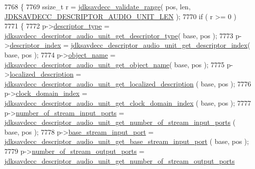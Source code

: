 \begin{DoxyCode}
7768 \{
7769     ssize\_t r = \hyperlink{group__util_ga9c02bdfe76c69163647c3196db7a73a1}{jdksavdecc\_validate\_range}( pos, len, 
      \hyperlink{group__descriptor__audio_ga9dc3459aa940c794fe03d7a04c3319c4}{JDKSAVDECC\_DESCRIPTOR\_AUDIO\_UNIT\_LEN} );
7770     \textcolor{keywordflow}{if} ( r >= 0 )
7771     \{
7772         p->\hyperlink{structjdksavdecc__descriptor__audio__unit_ab7c32b6c7131c13d4ea3b7ee2f09b78d}{descriptor\_type} = 
      \hyperlink{group__descriptor__audio_gad4b7e68dd3406168dbae73a3544a75ee}{jdksavdecc\_descriptor\_audio\_unit\_get\_descriptor\_type}( 
      base, pos );
7773         p->\hyperlink{structjdksavdecc__descriptor__audio__unit_a042bbc76d835b82d27c1932431ee38d4}{descriptor\_index} = 
      \hyperlink{group__descriptor__audio_gaa38833b7503f98f35a7047d138c55d63}{jdksavdecc\_descriptor\_audio\_unit\_get\_descriptor\_index}(
       base, pos );
7774         p->\hyperlink{structjdksavdecc__descriptor__audio__unit_a7d1f5945a13863b1762fc6db74fa8f80}{object\_name} = 
      \hyperlink{group__descriptor__audio_ga76bbf6a2c3634646b50a8987dafb5f96}{jdksavdecc\_descriptor\_audio\_unit\_get\_object\_name}( base, pos
       );
7775         p->\hyperlink{structjdksavdecc__descriptor__audio__unit_a0926f846ca65a83ad5bb06b4aff8f408}{localized\_description} = 
      \hyperlink{group__descriptor__audio_gaac4d24b626fb7665f8ebf4d98181b09c}{jdksavdecc\_descriptor\_audio\_unit\_get\_localized\_description}
      ( base, pos );
7776         p->\hyperlink{structjdksavdecc__descriptor__audio__unit_a6608f023d147b556a49527d568abed8e}{clock\_domain\_index} = 
      \hyperlink{group__descriptor__audio_ga2ae8a985361ba0fbe5c0ab4db5668ce8}{jdksavdecc\_descriptor\_audio\_unit\_get\_clock\_domain\_index}
      ( base, pos );
7777         p->\hyperlink{structjdksavdecc__descriptor__audio__unit_ad00c23883f3271704e11719abc6f7ad7}{number\_of\_stream\_input\_ports} = 
      \hyperlink{group__descriptor__audio_gadd8c4db853ace5bf571c73f102656e62}{jdksavdecc\_descriptor\_audio\_unit\_get\_number\_of\_stream\_input\_ports}
      ( base, pos );
7778         p->\hyperlink{structjdksavdecc__descriptor__audio__unit_a8ad4ba35aee3ad22d5e946438bbaba53}{base\_stream\_input\_port} = 
      \hyperlink{group__descriptor__audio_ga8d39d93a26faf1a376e88be7618f5f1d}{jdksavdecc\_descriptor\_audio\_unit\_get\_base\_stream\_input\_port}
      ( base, pos );
7779         p->\hyperlink{structjdksavdecc__descriptor__audio__unit_a6b331604e3f2b2db126dbf0a7c81b0fa}{number\_of\_stream\_output\_ports} = 
      \hyperlink{group__descriptor__audio_ga6d154b4647f125c6bf7cd483575ae7eb}{jdksavdecc\_descriptor\_audio\_unit\_get\_number\_of\_stream\_output\_ports}

\end{DoxyCode}
